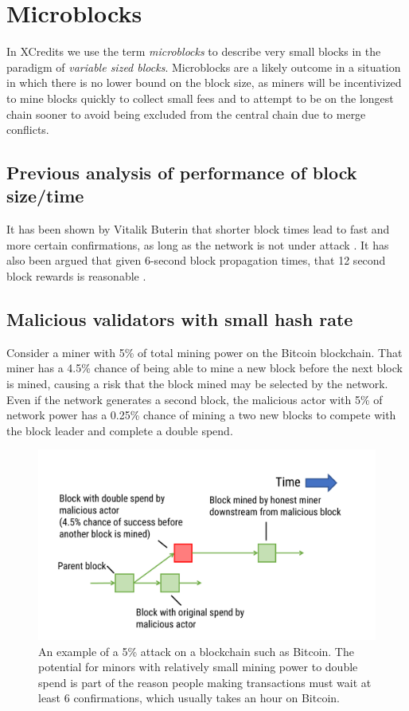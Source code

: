 \documentclass[a4paper,12pt]{article}
\begin{document}
\section{Microblocks}
In XCredits we use the term \textit{\gls{microblocks}} to describe very small blocks in the paradigm of \textit{variable sized blocks}. Microblocks are a likely outcome in a situation in which there is no lower bound on the block size, as miners will be incentivized to mine blocks quickly to collect small fees and to attempt to be on the longest chain sooner to avoid being excluded from the central chain due to merge conflicts. 

\subsection{Previous analysis of performance of block size/time}\label{block-time-performance}

It has been shown by Vitalik Buterin that shorter block times lead to fast and more certain confirmations, as long as the network is not under attack \cite{onSlowAndFastBlockTimes}. It has also been argued that given 6-second block propagation times, that 12 second block rewards is reasonable \cite{towardA12SecondBlockTime}. 

\subsection{Malicious validators with small hash rate}
Consider a miner with 5\% of total mining power on the Bitcoin blockchain. That miner has a 4.5\% chance of being able to mine a new block before the next block is mined, causing a risk that the block mined may be selected by the network. Even if the network generates a second block, the malicious actor with 5\% of network power has a 0.25\% chance of mining a two new blocks to compete with the block leader and complete a double spend. 

\begin{figure}[!htb]
  \centering
  \includegraphics[page=1,width=.95\textwidth]{5-percent-attack} 
  \caption{An example of a 5\% attack on a blockchain such as Bitcoin. The potential for minors with relatively small mining power to double spend is part of the reason people making transactions must wait at least 6 confirmations, which usually takes an hour on Bitcoin.}
  \label{fig:5-percent-attack}
\end{figure}
\FloatBarrier
\end{document}
